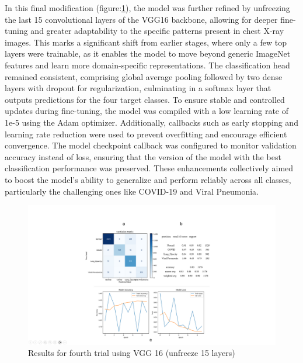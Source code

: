 \documentclass{article}
\begin{document}
In this final modification (figure:\ref{fig:vgg16result5.png}), the model was further refined by unfreezing the last 15 convolutional layers of the VGG16 backbone, allowing for deeper fine-tuning and greater adaptability to the specific patterns present in chest X-ray images. This marks a significant shift from earlier stages, where only a few top layers were trainable, as it enables the model to move beyond generic ImageNet features and learn more domain-specific representations. The classification head remained consistent, comprising global average pooling followed by two dense layers with dropout for regularization, culminating in a softmax layer that outputs predictions for the four target classes. To ensure stable and controlled updates during fine-tuning, the model was compiled with a low learning rate of 1e-5 using the Adam optimizer. Additionally, callbacks such as early stopping and learning rate reduction were used to prevent overfitting and encourage efficient convergence. The model checkpoint callback was configured to monitor validation accuracy instead of loss, ensuring that the version of the model with the best classification performance was preserved. These enhancements collectively aimed to boost the model's ability to generalize and perform reliably across all classes, particularly the challenging ones like COVID-19 and Viral Pneumonia.
\begin{figure}[h!] %
    \centering
    \includegraphics[width=1.0\linewidth]{vgg15-15.png}
    \caption{Results for fourth trial using VGG 16 (unfreeze 15 layers)}
    \label{fig:vgg16result5.png}
\end{figure}
\end{document}
